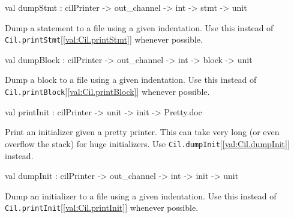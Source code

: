 \documentclass[11pt]{article}
\begin{document}
\label{val:Cil.dumpStmt}\begin{ocamldoccode}
val dumpStmt : cilPrinter -> out_channel -> int -> stmt -> unit
\end{ocamldoccode}
\begin{ocamldocdescription}
Dump a statement to a file using a given indentation. Use this instead of 
 {\tt{Cil.printStmt}}[\ref{val:Cil.printStmt}] whenever possible.


\end{ocamldocdescription}




\label{val:Cil.dumpBlock}\begin{ocamldoccode}
val dumpBlock : cilPrinter -> out_channel -> int -> block -> unit
\end{ocamldoccode}
\begin{ocamldocdescription}
Dump a block to a file using a given indentation. Use this instead of 
 {\tt{Cil.printBlock}}[\ref{val:Cil.printBlock}] whenever possible.


\end{ocamldocdescription}




\label{val:Cil.printInit}\begin{ocamldoccode}
val printInit : cilPrinter -> unit -> init -> Pretty.doc
\end{ocamldoccode}
\begin{ocamldocdescription}
Print an initializer given a pretty printer. This can take very long 
 (or even overflow the stack) for huge initializers. Use {\tt{Cil.dumpInit}}[\ref{val:Cil.dumpInit}] 
 instead.


\end{ocamldocdescription}




\label{val:Cil.dumpInit}\begin{ocamldoccode}
val dumpInit : cilPrinter -> out_channel -> int -> init -> unit
\end{ocamldoccode}
\begin{ocamldocdescription}
Dump an initializer to a file using a given indentation. Use this instead of 
 {\tt{Cil.printInit}}[\ref{val:Cil.printInit}] whenever possible.


\end{ocamldocdescription}
\end{document}
